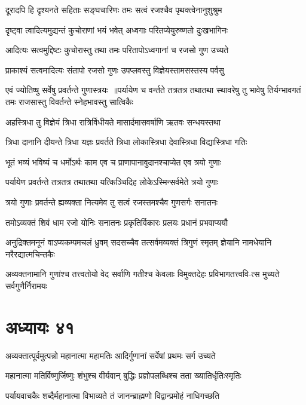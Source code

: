 \twolineshloka
{दूरादपि हि दृश्यनते सहिताः सङ्घचारिणः}
{तमः सत्वं रजश्चैव पृथक्त्वेनानुशुश्रुम}


\twolineshloka
{दृष्ट्वा त्वादित्यमुद्यन्तं कुचोराणां भयं भवेत्}
{अध्वगाः परितप्येयुरुष्णतो दुःखभागिनः}


\twolineshloka
{आदित्यः सत्वमुद्दिष्टः कुचोरास्तु तथा तमः}
{परितापोऽध्वगानां च रजसो गुण उच्यते}


\twolineshloka
{प्राकाश्यं सत्वमादित्यः संतापो रजसो गुणः}
{उपप्लवस्तु विज्ञेयस्तामसस्तस्य पर्वसु}


एवं ज्योतिष्षु सर्वेषु प्रवर्तन्ते गुणास्त्रयः ॥पर्यायेण च वर्न्तते तत्रतत्र तथातथा
\twolineshloka
{स्थावरेषु तु भावेषु तिर्यग्भावगतं तमः}
{राजसास्तु विवर्तन्ते स्नेहभावस्तु सात्विकैः}


\twolineshloka
{अहस्त्रिधा तु विज्ञेयं त्रिधा रात्रिर्विधीयते}
{मासार्दमासवर्षाणि ऋतवः सन्धयस्तथा}


\twolineshloka
{त्रिधा दानानि दीयन्ते त्रिधा यज्ञः प्रवर्तते}
{त्रिधा लोकास्त्रिधा देवास्त्रिधा विद्यास्त्रिधा गतिः}


\twolineshloka
{भूतं भव्यं भविष्यं च धर्मोऽर्थः काम एव च}
{प्राणापानावुदानश्चाप्येत एव त्रयो गुणाः}


\twolineshloka
{पर्यायेण प्रवर्तन्ते तत्रतत्र तथातथा}
{यत्किञ्चिदिह लोकेऽस्मिन्सर्वमेते त्रयो गुणाः}


\twolineshloka
{त्रयो गुणाः प्रवर्तन्ते ह्यव्यक्ता नित्यमेव तु}
{सत्वं रजस्तमश्चैव गुणसर्गः सनातनः}


\twolineshloka
{तमोऽव्यक्तं शिवं धाम रजो योनिः सनातनः}
{प्रकृतिर्विकारः प्रलयः प्रधानं प्रभवाप्ययौ}


\threelineshloka
{अनुद्रिक्तमनूनं वाऽप्यकम्पमचलं ध्रुवम्}
{सदसच्चैव तत्सर्वमव्यक्तं त्रिगुणं स्मृतम्}
{ज्ञेयानि नामधेयानि नरैरद्यात्मचिन्तकैः}


\twolineshloka
{अव्यक्तनामानि गुणांश्च तत्त्वतोयो वेद सर्वाणि गतीश्च केवलाः}
{विमुक्तदेहः प्रविभागतत्त्ववि-त्स मुच्यते सर्वगुणैर्निरामयः}


\chapter{अध्यायः ४१}
\twolineshloka
{अव्यक्तात्पूर्वमुत्पन्नो महानात्मा महामतिः}
{आदिर्गुणानां सर्वेषां प्रथमः सर्ग उच्यते}


\threelineshloka
{महानात्मा मतिर्विष्णुर्जिष्णुः शंभुश्च वीर्यवान्}
{बुद्धिः प्रज्ञोपलब्धिश्च तता ख्यातिर्धृतिःस्मृतिः}
{}


\twolineshloka
{पर्यायवाचकैः शब्दैर्महानात्मा विभाव्यते}
{तं जानन्ब्राह्मणो विद्वान्प्रमोहं नाधिगच्छति}



